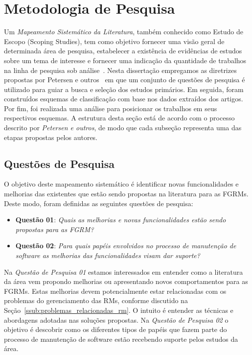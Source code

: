 \section{Metodologia de Pesquisa}
\label{sec:map-metodologia}

Um \textit{Mapeamento Sistemático da Literatura}, também conhecido como Estudo
de Escopo (Scoping Studies), tem como objetivo fornecer uma visão geral de
determinada área de pesquisa, estabelecer a existência de evidências de estudos
sobre um tema de interesse e fornecer uma indicação da quantidade de trabalhos
na linha de pesquisa sob
análise~\cite{keele2007guidelines,wohlin2012experimentation}. Nesta dissertação
empregamos as diretrizes propostas por Petersen e outros~\cite{Petersen2008} em
que um conjunto de questões de pesquisa é utilizado para guiar a busca e seleção
dos estudos primários. Em seguida, foram construídos esquemas de classificação
com base nos dados extraídos dos artigos. Por fim, foi realizada uma análise
para posicionar os trabalhos em seus respectivos esquemas. A estrutura desta
seção está de acordo com o processo descrito por \textit{Petersen e outros}, de
modo que cada subseção representa uma das etapas propostas pelos autores.

\subsection{Questões de Pesquisa}
\label{subsec:map-questoes-de-pesquisa}

O objetivo deste mapeamento sistemático é identificar novas funcionalidades e
melhorias das existentes que estão sendo propostas na literatura para as FGRMs.
Deste modo, foram definidas as seguintes questões de pesquisa:

\begin{itemize}
	\item \textbf{Questão 01}: \textit{Quais as melhorias e novas
			funcionalidades estão sendo propostas para as FGRM?}
    \item \textbf{Questão 02}: \textit{Para quais papéis envolvidos no processo
            de manutenção de software as melhorias das funcionalidades visam
            dar suporte?}
\end{itemize}

Na \textit{Questão de Pesquisa 01} estamos interessados em entender como a
literatura da área vem propondo melhorias ou apresentando novos comportamentos
para as FGRMs. Estas melhorias devem potencialmente estar relacionadas com os
problemas do gerenciamento das RMs, conforme discutido na
Seção~\ref{ssub:problemas_relacionadas_rm}. O intuito é entender as técnicas e
abordagens adotadas nas soluções propostas. Na \textit{Questão de Pesquisa 02} o
objetivo é descobrir como os diferentes tipos de papéis que fazem parte do
processo de manutenção de software estão recebendo suporte pelos estudos da
área.

